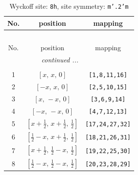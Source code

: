 \documentclass[fleqn,8pt]{jsarticle}
\begin{document}
\begin{longtable}{ccc}
\caption{Wyckoff site: {\tt 8h}, site symmetry: {\tt m'.2'm}}
 \\
 \hline \hline
No. & position & mapping \\ \hline \endfirsthead

\multicolumn{2}{l}{\tablename\ \thetable{}} \\
 \hline \hline
No. & position & mapping \\ \hline \endhead

 \hline \hline
\multicolumn{2}{r}{\footnotesize\it continued ...} \\ \endfoot

 \hline \hline
\multicolumn{2}{r}{} \\ \endlastfoot

1 & $\left[ x,\, x,\, 0 \right]$ & {\tt [1,8,11,16]} \\ \hline
2 & $\left[ - x,\, x,\, 0 \right]$ & {\tt [2,5,10,15]} \\ \hline
3 & $\left[ x,\, - x,\, 0 \right]$ & {\tt [3,6,9,14]} \\ \hline
4 & $\left[ - x,\, - x,\, 0 \right]$ & {\tt [4,7,12,13]} \\ \hline
5 & $\left[ x + \frac{1}{2},\, x + \frac{1}{2},\, \frac{1}{2} \right]$ & {\tt [17,24,27,32]} \\ \hline
6 & $\left[ \frac{1}{2} - x,\, x + \frac{1}{2},\, \frac{1}{2} \right]$ & {\tt [18,21,26,31]} \\ \hline
7 & $\left[ x + \frac{1}{2},\, \frac{1}{2} - x,\, \frac{1}{2} \right]$ & {\tt [19,22,25,30]} \\ \hline
8 & $\left[ \frac{1}{2} - x,\, \frac{1}{2} - x,\, \frac{1}{2} \right]$ & {\tt [20,23,28,29]} \\
\end{longtable}
\renewcommand{\arraystretch}{1.2}
\end{document}
